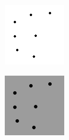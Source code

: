 \begin{minipage}{0.5\linewidth}
	\centering
	\includegraphics[width=0.9\linewidth]{./Experiments/BProp/fig/Input.png} 
\end{minipage}
\begin{minipage}{0.5\linewidth}
	\centering
	\includegraphics[width=0.9\linewidth]{./Experiments/BProp/fig/Output.png}
\end{minipage}
